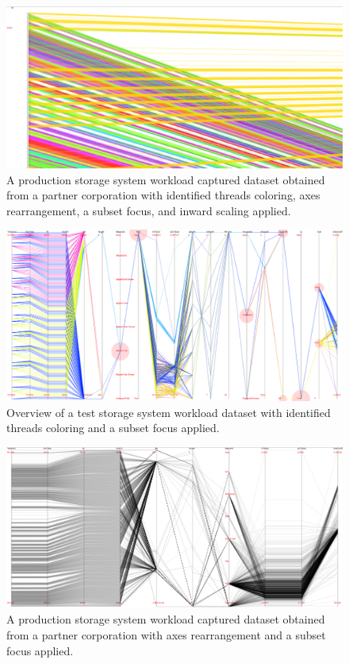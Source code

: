 \documentclass[12pt]{ucthesis}
\begin{document}
\begin{figure}[h!]
 \centering
 \includegraphics[width=\textwidth]{images/8.jpg}
 \caption[Focus applied on a production workload with threads colored.]{A production storage system workload captured dataset obtained from a partner corporation with identified threads coloring, axes rearrangement, a subset focus, and inward scaling applied.}
\end{figure}

\begin{figure}[h!]
 \centering
 \includegraphics[width=\textwidth]{images/9.jpg}
 \caption[Focus applied on a test workload with threads colored.]{Overview of a test storage system workload dataset with identified threads coloring and a subset focus applied.}
\end{figure}

\begin{figure}[h!]
 \centering
 \includegraphics[width=\textwidth]{images/10.jpg}
 \caption[Focus applied on a production workload.]{A production storage system workload captured dataset obtained from a partner corporation with axes rearrangement and a subset focus applied.}
\end{figure}
\end{document}
